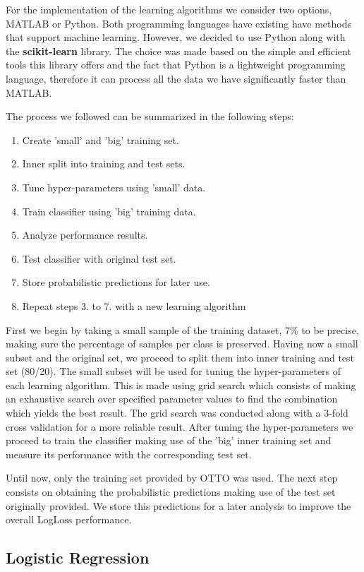 For the implementation of the learning algorithms we consider two options, MATLAB or Python. Both programming languages have existing have methods that support machine learning. However, we decided to use Python along with the \textbf{scikit-learn} library. The choice was made based on the simple and efficient tools this library offers and the fact that Python is a lightweight programming language, therefore it can process all the data we have significantly faster than MATLAB.

The process we followed can be summarized in the following steps:
\begin{enumerate}
	\item Create 'small' and 'big' training set.
	\item Inner split into training and test sets.
	\item Tune hyper-parameters using 'small' data.
	\item Train classifier using 'big' training data.
	\item Analyze performance results.
	\item Test classifier with original test set.
	\item Store probabilistic predictions for later use.
	\item Repeat steps 3. to 7. with a new learning algorithm
\end{enumerate}

First we begin by taking a small sample of the training dataset, 7\% to be precise, making sure the percentage of samples per class is preserved. Having now a small subset and the original set, we proceed to split them into inner training and test set (80/20). The small subset will be used for tuning the hyper-parameters of each learning algorithm. This is made using grid search which consists of making an exhaustive search over specified parameter values to find the combination which yields the best result. The grid search was conducted along with a 3-fold cross validation for a more reliable result. After tuning the hyper-parameters we proceed to train the classifier making use of the 'big' inner training set and measure its performance with the corresponding test set.

Until now, only the training set provided by OTTO was used. The next step consists on obtaining the probabilistic predictions making use of the test set originally provided. We store this predictions for a later analysis to improve the overall LogLoss performance.

\subsection{Logistic Regression}

